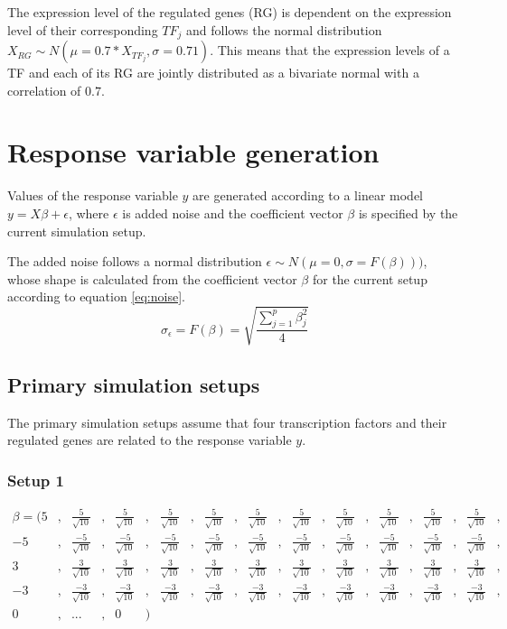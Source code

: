 The expression level of the regulated genes (RG) is dependent on the expression level of their corresponding $TF_j$ and follows the normal distribution $X_{RG} \sim N(\mu = 0.7*X_{TF_j}, \sigma = 0.71)$. This means that the expression levels of a TF and each of its RG are jointly distributed as a bivariate normal with a correlation of $0.7$.

\section{Response variable generation}
Values of the response variable $y$ are generated according to a linear model $y = X\beta + \epsilon$, where $\epsilon$ is added noise and the coefficient vector $\beta$ is specified by the current simulation setup.

The added noise follows a normal distribution $\epsilon \sim N(\mu = 0, \sigma = F(\beta)))$, whose shape is calculated from the coefficient vector $\beta$ for the current setup according to equation \ref{eq:noise}.
\begin{equation} \label{eq:noise}
\sigma_\epsilon = F(\beta) = \sqrt{\frac{\sum_{j=1}^{p}\beta_j^2}{4}}
\end{equation}

\subsection{Primary simulation setups}
The primary simulation setups assume that four transcription factors and their regulated genes are related to the response variable $y$.

\subsubsection{Setup 1}
\begin{equation} \label{eq:setup1} 
\begin{aligned}
\beta = (	5&,& \frac{5}{\sqrt{10}}&,&  \frac{5}{\sqrt{10}}&,&  \frac{5}{\sqrt{10}}&,&  \frac{5}{\sqrt{10}}&,&  \frac{5}{\sqrt{10}}&,&  \frac{5}{\sqrt{10}}&,&  \frac{5}{\sqrt{10}}&,&  \frac{5}{\sqrt{10}}&,&  \frac{5}{\sqrt{10}}&,&  \frac{5}{\sqrt{10}}&,& \\
-5&,& \frac{-5}{\sqrt{10}}&,&  \frac{-5}{\sqrt{10}}&,&  \frac{-5}{\sqrt{10}}&,&  \frac{-5}{\sqrt{10}}&,&  \frac{-5}{\sqrt{10}}&,&  \frac{-5}{\sqrt{10}}&,&  \frac{-5}{\sqrt{10}}&,&  \frac{-5}{\sqrt{10}}&,&  \frac{-5}{\sqrt{10}}&,&  \frac{-5}{\sqrt{10}}&,& \\
3&,& \frac{3}{\sqrt{10}}&,&  \frac{3}{\sqrt{10}}&,&  \frac{3}{\sqrt{10}}&,&  \frac{3}{\sqrt{10}}&,&  \frac{3}{\sqrt{10}}&,&  \frac{3}{\sqrt{10}}&,&  \frac{3}{\sqrt{10}}&,&  \frac{3}{\sqrt{10}}&,&  \frac{3}{\sqrt{10}}&,&  \frac{3}{\sqrt{10}}&,& \\
-3&,& \frac{-3}{\sqrt{10}}&,&  \frac{-3}{\sqrt{10}}&,&  \frac{-3}{\sqrt{10}}&,&  \frac{-3}{\sqrt{10}}&,&  \frac{-3}{\sqrt{10}}&,&  \frac{-3}{\sqrt{10}}&,&  \frac{-3}{\sqrt{10}}&,&  \frac{-3}{\sqrt{10}}&,&  \frac{-3}{\sqrt{10}}&,&  \frac{-3}{\sqrt{10}}&,& \\
0&,& ...&,& 0&)&
\end{aligned}
\end{equation}

